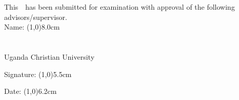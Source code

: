 This~\theTheDocumentType~has been submitted for examination with approval of the following advisors/supervisor.\\

Name: \line(1,0){8.0cm} \\
\theDepartment\\
\theFaculty\\
Uganda Christian University\\

\vspace{1.5cm}

Signature: \line(1,0){5.5cm}\par
\vspace{1.5cm}

Date:	\line(1,0){6.2cm}\par
